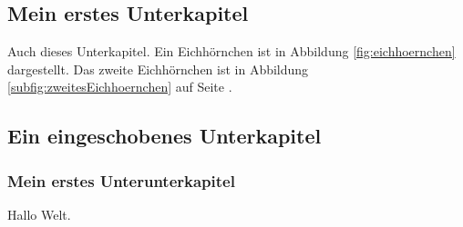 \documentclass{article}
\begin{document}
\subsection{Mein erstes Unterkapitel}
Auch dieses Unterkapitel. Ein Eichhörnchen ist in Abbildung \ref{fig:eichhoernchen} dargestellt. Das zweite Eichhörnchen ist in Abbildung \ref{subfig:zweitesEichhoernchen} auf Seite \pageref{subfig:zweitesEichhoernchen}.
\subsection{Ein eingeschobenes Unterkapitel}\label{subsec:eingeschobenesUnterkapitel}
\subsubsection{Mein erstes Unterunterkapitel}	
Hallo Welt.
\end{document}
